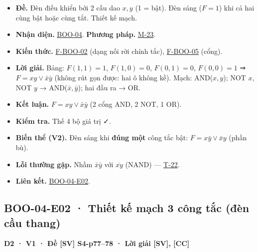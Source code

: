 \documentclass[
  10pt,
  twoside,openany]{book}
\providecommand{\tightlist}{%
  \setlength{\itemsep}{0pt}\setlength{\parskip}{0pt}}
\begin{document}
\begin{itemize}
\tightlist
\item
  \textbf{Đề.} Đèn điều khiển bởi 2 cầu dao \(x,y\) (1 = bật). Đèn sáng
  (\(F=1\)) khi cả hai cùng bật hoặc cùng tắt. Thiết kế mạch.
\item
  \textbf{Nhận diện.} \protect\hyperlink{BOO-04}{BOO-04}. \textbf{Phương
  pháp.} \protect\hyperlink{M-23}{M-23}.
\item
  \textbf{Kiến thức.} \protect\hyperlink{F-BOO-02}{F-BOO-02} (dạng nối
  rời chính tắc), \protect\hyperlink{F-BOO-05}{F-BOO-05} (cổng).
\item
  \textbf{Lời giải.} Bảng: \(F(1,1)=1\), \(F(1,0)=0\), \(F(0,1)=0\),
  \(F(0,0)=1\) ⇒ \(F=xy\vee\bar x\bar y\) (không rút gọn được: hai ô
  không kề). Mạch: AND(\(x,y\)); NOT \(x\), NOT \(y\) →
  AND(\(\bar x,\bar y\)); hai đầu ra → OR.
\item
  \textbf{Kết luận.} \(F=xy\vee\bar x\bar y\) (2 cổng AND, 2 NOT, 1 OR).
\item
  \textbf{Kiểm tra.} Thế 4 bộ giá trị ✓.
\item
  \textbf{Biến thể (V2).} Đèn sáng khi \textbf{đúng một} công tắc bật:
  \(F=x\bar y\vee\bar xy\) (phần bù).
\item
  \textbf{Lỗi thường gặp.} Nhầm \(\bar x\bar y\) với \(\overline{xy}\)
  (NAND) --- \protect\hyperlink{T-22}{T-22}.
\item
  \textbf{Liên kết.} \protect\hyperlink{BOO-04-E02}{BOO-04-E02}.
\end{itemize}

\hypertarget{BOO-04-E02}{%
\subsection{BOO-04-E02 · Thiết kế mạch 3 công tắc (đèn cầu
thang)}\label{BOO-04-E02}}

\textbf{D2 · V1 · Đề {[}SV{]} S4-p77--78 · Lời giải {[}SV{]}, {[}CC{]}}
\end{document}
